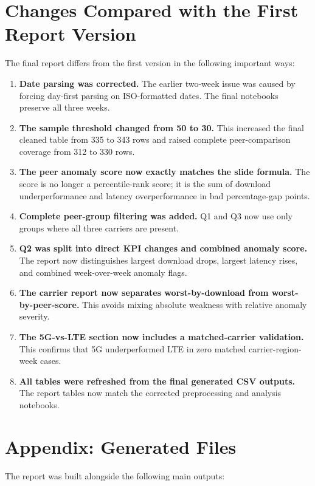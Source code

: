 \documentclass[12pt,a4paper]{article}
\begin{document}
\section{Changes Compared with the First Report Version}

The final report differs from the first version in the following important ways:

\begin{enumerate}[label=\arabic*.]
    \item \textbf{Date parsing was corrected.} The earlier two-week issue was caused by forcing day-first parsing on ISO-formatted dates. The final notebooks preserve all three weeks.
    \item \textbf{The sample threshold changed from 50 to 30.} This increased the final cleaned table from 335 to 343 rows and raised complete peer-comparison coverage from 312 to 330 rows.
    \item \textbf{The peer anomaly score now exactly matches the slide formula.} The score is no longer a percentile-rank score; it is the sum of download underperformance and latency overperformance in bad percentage-gap points.
    \item \textbf{Complete peer-group filtering was added.} Q1 and Q3 now use only groups where all three carriers are present.
    \item \textbf{Q2 was split into direct KPI changes and combined anomaly score.} The report now distinguishes largest download drops, largest latency rises, and combined week-over-week anomaly flags.
    \item \textbf{The carrier report now separates worst-by-download from worst-by-peer-score.} This avoids mixing absolute weakness with relative anomaly severity.
    \item \textbf{The 5G-vs-LTE section now includes a matched-carrier validation.} This confirms that 5G underperformed LTE in zero matched carrier-region-week cases.
    \item \textbf{All tables were refreshed from the final generated CSV outputs.} The report tables now match the corrected preprocessing and analysis notebooks.
\end{enumerate}

\section*{Appendix: Generated Files}

The report was built alongside the following main outputs:
\end{document}
